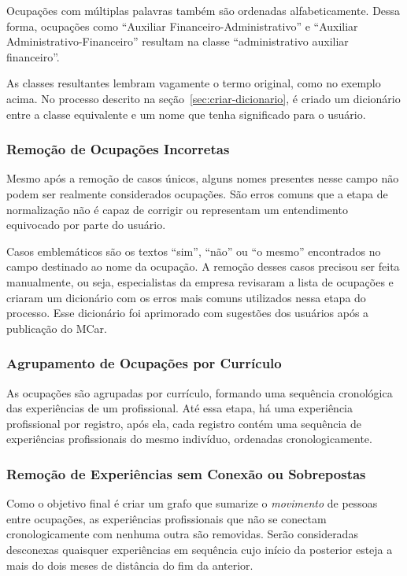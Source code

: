 \documentclass[12pt,a4paper]{article}
\theoremstyle{hypo}
\begin{document}
Ocupações com múltiplas palavras também são ordenadas alfabeticamente. Dessa forma, ocupações como \enquote{Auxiliar Financeiro-Administrativo} e \enquote{Auxiliar Administrativo-Financeiro} resultam na classe \enquote{administrativo auxiliar financeiro}.

As classes resultantes lembram vagamente o termo original, como no exemplo acima. No processo descrito na seção~\ref{sec:criar-dicionario}, é criado um dicionário entre a classe equivalente e um nome que tenha significado para o usuário.

\subsubsection{Remoção de Ocupações Incorretas} \label{sec:remocao-ocupacoes-incorretas}

Mesmo após a remoção de casos únicos, alguns nomes presentes nesse campo não podem ser realmente considerados ocupações. São erros comuns que a etapa de normalização não é capaz de corrigir ou representam um entendimento equivocado por parte do usuário.

Casos emblemáticos são os textos \enquote{sim}, \enquote{não} ou \enquote{o mesmo} encontrados no campo destinado ao nome da ocupação. A remoção desses casos precisou ser feita manualmente, ou seja, especialistas da empresa revisaram a lista de ocupações e criaram um dicionário com os erros mais comuns utilizados nessa etapa do processo. Esse dicionário foi aprimorado com sugestões dos usuários após a publicação do MCar.

\subsubsection{Agrupamento de Ocupações por Currículo}

As ocupações são agrupadas por currículo, formando uma sequência cronológica das experiências de um profissional. Até essa etapa, há uma experiência profissional por registro, após ela, cada registro contém uma sequência de experiências profissionais do mesmo indivíduo, ordenadas cronologicamente.


\subsubsection{Remoção de Experiências sem Conexão ou Sobrepostas}

Como o objetivo final é criar um grafo que sumarize o \textit{movimento} de pessoas entre ocupações, as experiências profissionais que não se conectam cronologicamente com nenhuma outra são removidas. Serão consideradas desconexas quaisquer experiências em sequência cujo início da posterior esteja a mais do dois meses de distância do fim da anterior.
\end{document}
